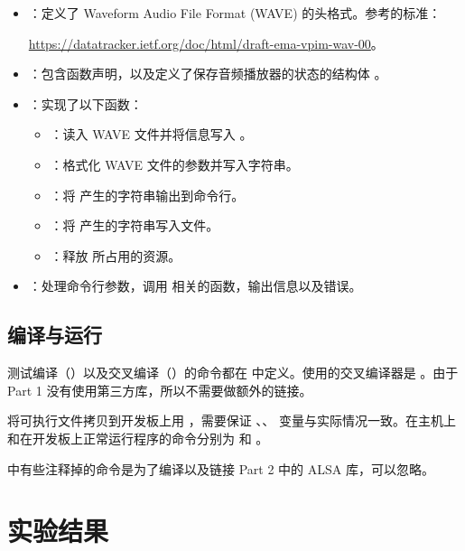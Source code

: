 \begin{itemize}
    \item {}：定义了 Waveform Audio File Format (WAVE) 的头格式。参考的标准：
    
    \url{https://datatracker.ietf.org/doc/html/draft-ema-vpim-wav-00}。
    \item {}：包含函数声明，以及定义了保存音频播放器的状态的结构体 。
    \item {}：实现了以下函数：
    \begin{itemize}
        \item {}：读入 WAVE 文件并将信息写入 。
        \item {}：格式化 WAVE 文件的参数并写入字符串。
        \item {}：将  产生的字符串输出到命令行。
        \item {}：将  产生的字符串写入文件。
        \item {}：释放  所占用的资源。
    \end{itemize}
    \item {}：处理命令行参数，调用  相关的函数，输出信息以及错误。
\end{itemize}

\subsection{编译与运行}\label{sec:compile}

测试编译（）以及交叉编译（）的命令都在  中定义。使用的交叉编译器是 。由于 Part 1 没有使用第三方库，所以不需要做额外的链接。

将可执行文件拷贝到开发板上用 ，需要保证 、、 变量与实际情况一致。在主机上和在开发板上正常运行程序的命令分别为  和 。

 中有些注释掉的命令是为了编译以及链接 Part 2 中的 ALSA 库，可以忽略。

\section{实验结果}



